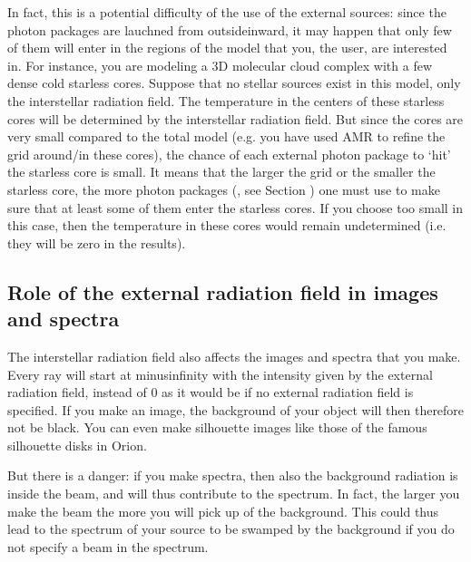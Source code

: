 \documentclass[letterpaper,10pt,english]{sphinxmanual}
\begin{document}
In fact, this is a potential difficulty of the use of the external sources:
since the photon packages are lauchned from outside\sphinxhyphen{}inward, it may happen that
only few of them will enter in the regions of the model that you, the user, are
interested in. For instance, you are modeling a 3\sphinxhyphen{}D molecular cloud complex with
a few dense cold starless cores. Suppose that no stellar sources exist in this
model, only the interstellar radiation field. The temperature in the centers of
these starless cores will be determined by the interstellar radiation field. But
since the cores are very small compared to the total model (e.g. you have used
AMR to refine the grid around/in these cores), the chance of each external
photon package to ‘hit’ the starless core is small. It means that the larger the
grid or the smaller the starless core, the more photon packages (,
see Section {\hyperref[\detokenize{dustradtrans:sec-dust-thermal-monte-carlo}]{}}) one must use to make sure that
at least some of them enter the starless cores. If you choose  too small
in this case, then the temperature in these cores would remain undetermined
(i.e. they will be zero in the results).


\subsection{Role of the external radiation field in images and spectra}
\label{\detokenize{stars:role-of-the-external-radiation-field-in-images-and-spectra}}
The interstellar radiation field also affects the images and spectra that
you make. Every ray will start at minus\sphinxhyphen{}infinity with the intensity given by
the external radiation field, instead of 0 as it would be if no external
radiation field is specified. If you make an image, the background of your
object will then therefore not be black. You can even make silhouette images
like those of the famous silhouette disks in Orion.

But there is a danger: if you make spectra, then also the background
radiation is inside the beam, and will thus contribute to the spectrum.
In fact, the larger you make the beam the more you will pick up of the
background. This could thus lead to the spectrum of your source to be
swamped by the background if you do not specify a beam in the spectrum.
\end{document}
